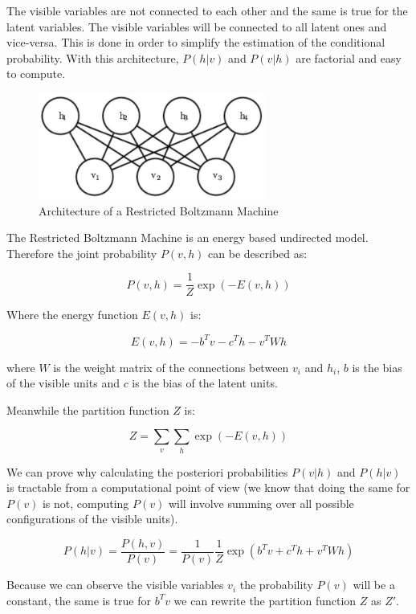 \noindent The visible variables are not connected to each other and the same is true for the latent variables. The visible variables will be connected to all latent ones and vice-versa. This is done in order to simplify the estimation of the conditional probability. With this architecture, $P(h | v)$ and $P(v | h)$ are factorial and easy to compute. 

\begin{figure}[h]
    \centering
    \includegraphics[width=7.5cm]{Images/rbm.jpg}
    \caption{Architecture of a Restricted Boltzmann Machine}
\end{figure}

\noindent The Restricted Boltzmann Machine is an energy based undirected model. Therefore the joint probability $P(v, h)$ can be described as:

$$ P(v, h) = \frac{1}{Z} \exp{\left( -E \left(v, h\right) \right)} $$

\noindent Where the energy function $E(v, h)$ is:

$$ E(v, h) = -b^{T}v -c^{T}h -v^{T}W h $$

where $W$ is the weight matrix of the connections between $v_i$ and $h_i$, $b$ is the bias of the visible units and $c$ is the bias of the latent units.

\noindent Meanwhile the partition function $Z$ is:

$$ Z = \sum_v \sum_h \exp \left( -E(v, h)  \right) $$

\noindent We can prove why calculating the posteriori probabilities $P(v|h)$ and $P(h|v)$ is tractable from a computational point of view (we know that doing the same for $P(v)$ is not, computing $P(v)$ will involve summing over all possible configurations of the visible units).

$$ P(h | v) = \frac{P(h, v)}{P(v)} = \frac{1}{P(v)} \frac{1}{Z} \exp \left( b^{T}v + c^{T}h + v^{T}W h  \right) $$

\noindent Because we can observe the visible variables $v_i$ the probability $P(v)$ will be a constant, the same is true for $b^Tv$ we can rewrite the partition function $Z$ as $Z'$.

